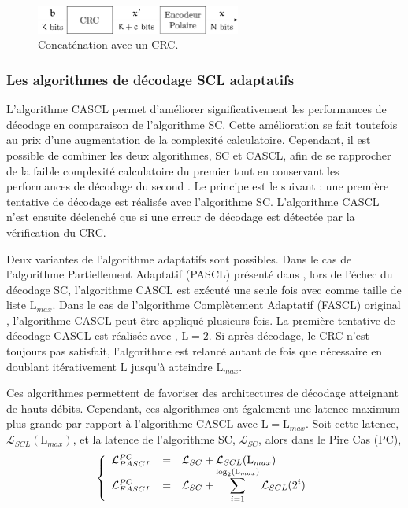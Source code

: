 \begin{figure}[t]
\centering
\includegraphics[width=0.6\textwidth]{main/ch1_fig/crc}
\caption{Concaténation avec un CRC.}
\label{fig:crc}
\end{figure}
\subsubsection{Les algorithmes de décodage SCL adaptatifs}
\label{subsubsec:adaptive}

L'algorithme CASCL permet d'améliorer significativement les performances de décodage en comparaison de l'algorithme SC.
Cette amélioration se fait toutefois au prix d'une augmentation de la complexité calculatoire.
Cependant, il est possible de combiner les deux algorithmes, SC et CASCL, afin de se rapprocher de la faible complexité calculatoire du premier tout en conservant les performances de décodage du second \cite{li_adaptive_2012}.
Le principe est le suivant : une première tentative de décodage est réalisée avec l'algorithme SC. 
L'algorithme CASCL n'est ensuite déclenché que si une erreur de décodage est détectée par la vérification du CRC.

Deux variantes de l'algorithme adaptatifs sont possibles.
Dans le cas de l'algorithme Partiellement Adaptatif (PASCL) présenté dans \cite{sarkis_fast_2016}, lors de l'échec du décodage SC, l'algorithme CASCL est exécuté une seule fois avec comme taille de liste $\mathrm{L}_{max}$.
Dans le cas de l'algorithme Complètement Adaptatif (FASCL) original \cite{li_adaptive_2012}, l'algorithme CASCL peut être appliqué plusieurs fois.
La première tentative de décodage CASCL est réalisée avec , $\mathrm{L}=2$. Si après décodage, le CRC n'est toujours pas satisfait, l'algorithme est relancé autant de fois que nécessaire en doublant itérativement $\mathrm{L}$ jusqu'à atteindre $\mathrm{L}_{max}$.



Ces algorithmes permettent de favoriser des architectures de décodage atteignant de hauts débits. Cependant, ces algorithmes ont également une latence maximum plus grande par rapport à l'algorithme CASCL avec $\mathrm{L}=\mathrm{L}_{max}$. Soit cette latence, $\mathcal{L}_{SCL}(\mathrm{L}_{max})$, et la latence de l'algorithme SC, $\mathcal{L}_{SC}$, alors dans le Pire Cas (PC),
\begin{equation*}
\left\{\begin{array}{l c l}
\mathcal{L}^{PC}_{PASCL} & = &\mathcal{L}_{SC} + \mathcal{L}_{SCL}(\mathrm{L}_{max})\\
\mathcal{L}^{PC}_{FASCL} & = &\mathcal{L}_{SC} + \displaystyle\sum_{i=1}^{\log_2(\mathrm{L}_{max})}\mathcal{L}_{SCL}(2^i)
 \end{array}\right.
\end{equation*}

